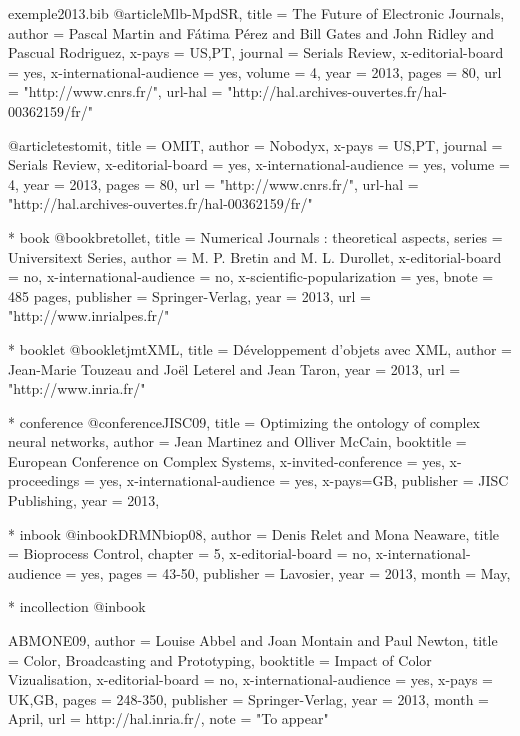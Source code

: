 \documentclass{ra2013}
\begin{document}
\begin{filecontents+}{exemple2013.bib}
@article{Mlb-MpdSR,
title = {The Future of Electronic Journals},
author = {Pascal Martin and Fátima Pérez and Bill Gates and John Ridley and Pascual Rodriguez},
x-pays = {US,PT},
journal = {Serials Review}, 
x-editorial-board = {yes}, 
x-international-audience = {yes}, 
volume = 4, 
year = 2013, 
pages = 80, 
url =  "http://www.cnrs.fr/",
url-hal = "http://hal.archives-ouvertes.fr/hal-00362159/fr/"
} 

@article{testomit,
title = {OMIT},
author = {Nobodyx},
x-pays = {US,PT},
journal = {Serials Review}, 
x-editorial-board = {yes}, 
x-international-audience = {yes}, 
volume = 4, 
year = 2013, 
pages = 80, 
url =  "http://www.cnrs.fr/",
url-hal = "http://hal.archives-ouvertes.fr/hal-00362159/fr/"
} 

    * book
@book{bretollet,
title = {Numerical Journals : theoretical aspects}, 
series = {Universitext Series}, 
author = {M. P. Bretin and M. L. Durollet}, 
x-editorial-board = {no}, 
x-international-audience = {no}, 
x-scientific-popularization = {yes}, 
bnote = {485 pages}, 
publisher = {Springer-Verlag}, 
year = 2013, 
url = "http://www.inrialpes.fr/"
}


    * booklet
@booklet{jmtXML,
title = {Développement d'objets avec XML}, 
author = {Jean-Marie Touzeau and Joël Leterel and Jean Taron}, 
year = 2013, 
url =  "http://www.inria.fr/"
}
	
	
    * conference
@conference{JISC09,
title = {Optimizing the ontology of complex neural networks}, 
author = {Jean Martinez and Olliver McCain}, 
booktitle = {European Conference on Complex Systems}, 
x-invited-conference = {yes}, 
x-proceedings = {yes}, 
x-international-audience = {yes}, 
x-pays={GB},
publisher = {JISC Publishing}, 
year = 2013, 
}


    * inbook
@inbook{DRMNbiop08,
author = {Denis Relet and Mona Neaware}, 
title = {Bioprocess Control}, 
chapter = {5}, 
x-editorial-board = {no}, 
x-international-audience = {yes}, 
pages = {43-50}, 
publisher = {Lavosier}, 
year = 2013, 
month = {May}, 
}


	* incollection
@inbook{ABMONE09,
author = {Louise Abbel and Joan Montain and Paul Newton}, 
title = {Color, Broadcasting and Prototyping}, 
booktitle = {Impact of Color Vizualisation}, 
x-editorial-board = {no}, 
x-international-audience = {yes}, 
x-pays = {UK,GB},
pages = {248-350}, 
publisher = {Springer-Verlag}, 
year = 2013, 
month = {April},
url = {http://hal.inria.fr/}, 
note = "To appear"

}
\end{filecontents+}
\end{document}
